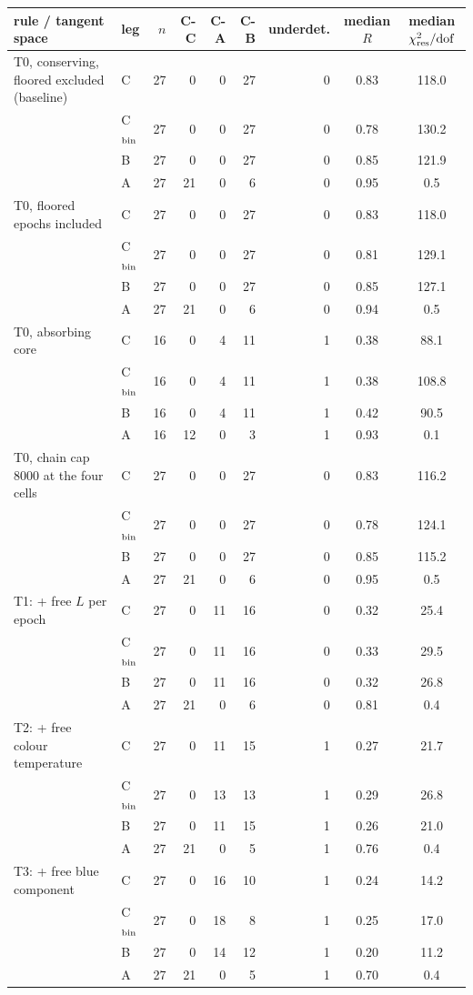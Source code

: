 \begin{tabular}{llrrrrrcc}
\toprule
rule / tangent space & leg & $n$ & C-C & C-A & C-B & underdet. & median $R$ & median $\chi^2_{\rm res}/{\rm dof}$ \\
\midrule
T0, conserving, floored excluded (baseline) & C & 27 & 0 & 0 & 27 & 0 & 0.83 & 118.0 \\
 & C$_{\rm bin}$ & 27 & 0 & 0 & 27 & 0 & 0.78 & 130.2 \\
 & B & 27 & 0 & 0 & 27 & 0 & 0.85 & 121.9 \\
 & A & 27 & 21 & 0 & 6 & 0 & 0.95 & 0.5 \\
T0, floored epochs included & C & 27 & 0 & 0 & 27 & 0 & 0.83 & 118.0 \\
 & C$_{\rm bin}$ & 27 & 0 & 0 & 27 & 0 & 0.81 & 129.1 \\
 & B & 27 & 0 & 0 & 27 & 0 & 0.85 & 127.1 \\
 & A & 27 & 21 & 0 & 6 & 0 & 0.94 & 0.5 \\
T0, absorbing core & C & 16 & 0 & 4 & 11 & 1 & 0.38 & 88.1 \\
 & C$_{\rm bin}$ & 16 & 0 & 4 & 11 & 1 & 0.38 & 108.8 \\
 & B & 16 & 0 & 4 & 11 & 1 & 0.42 & 90.5 \\
 & A & 16 & 12 & 0 & 3 & 1 & 0.93 & 0.1 \\
T0, chain cap 8000 at the four cells & C & 27 & 0 & 0 & 27 & 0 & 0.83 & 116.2 \\
 & C$_{\rm bin}$ & 27 & 0 & 0 & 27 & 0 & 0.78 & 124.1 \\
 & B & 27 & 0 & 0 & 27 & 0 & 0.85 & 115.2 \\
 & A & 27 & 21 & 0 & 6 & 0 & 0.95 & 0.5 \\
T1: + free $L$ per epoch & C & 27 & 0 & 11 & 16 & 0 & 0.32 & 25.4 \\
 & C$_{\rm bin}$ & 27 & 0 & 11 & 16 & 0 & 0.33 & 29.5 \\
 & B & 27 & 0 & 11 & 16 & 0 & 0.32 & 26.8 \\
 & A & 27 & 21 & 0 & 6 & 0 & 0.81 & 0.4 \\
T2: + free colour temperature & C & 27 & 0 & 11 & 15 & 1 & 0.27 & 21.7 \\
 & C$_{\rm bin}$ & 27 & 0 & 13 & 13 & 1 & 0.29 & 26.8 \\
 & B & 27 & 0 & 11 & 15 & 1 & 0.26 & 21.0 \\
 & A & 27 & 21 & 0 & 5 & 1 & 0.76 & 0.4 \\
T3: + free blue component & C & 27 & 0 & 16 & 10 & 1 & 0.24 & 14.2 \\
 & C$_{\rm bin}$ & 27 & 0 & 18 & 8 & 1 & 0.25 & 17.0 \\
 & B & 27 & 0 & 14 & 12 & 1 & 0.20 & 11.2 \\
 & A & 27 & 21 & 0 & 5 & 1 & 0.70 & 0.4 \\
\bottomrule
\end{tabular}
